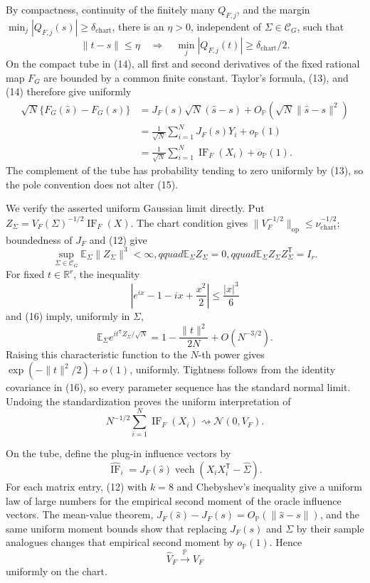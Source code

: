 By compactness, continuity of the finitely many \(Q_{F,j}\), and the margin \(\min_j|Q_{F,j}(s)|\geq\delta_{\mathrm{chart}}\), there is an \(\eta>0\), independent of \(\Sigma\in\mathcal C_G\), such that
\[
 \|t-s\|\leq\eta\quad\Longrightarrow\quad
 \min_j|Q_{F,j}(t)|\geq\delta_{\mathrm{chart}}/2. \tag{14}
\]
On the compact tube in (14), all first and second derivatives of the fixed rational map \(F_G\) are bounded by a common finite constant.  Taylor's formula, (13), and (14) therefore give uniformly
\[
 \begin{aligned}
 \sqrt N\{F_G(\widehat s)-F_G(s)\}
 &=J_F(s)\sqrt N(\widehat s-s)+O_{\mathbb P}\!\left(\sqrt N\|\widehat s-s\|^2\right)\\
 &=\frac1{\sqrt N}\sum_{i=1}^N J_F(s)Y_i+o_{\mathbb P}(1)\\
 &=\frac1{\sqrt N}\sum_{i=1}^N\operatorname{IF}_F(X_i)+o_{\mathbb P}(1). \tag{15}
 \end{aligned}
\]
The complement of the tube has probability tending to zero uniformly by (13), so the pole convention does not alter (15).

We verify the asserted uniform Gaussian limit directly.  Put \(Z_{\Sigma}=V_F(\Sigma)^{-1/2}\operatorname{IF}_F(X)\).  The chart condition gives \(\|V_F^{-1/2}\|_{\mathrm{op}}\leq\nu_{\mathrm{chart}}^{-1/2}\); boundedness of \(J_F\) and (12) give
\[
 \sup_{\Sigma\in\mathcal C_G}\mathbb E_\Sigma\|Z_\Sigma\|^3<\infty,qquad
 \mathbb E_\Sigma Z_\Sigma=0,qquad
 \mathbb E_\Sigma Z_\Sigma Z_\Sigma^{\mathsf T}=I_r. \tag{16}
\]
For fixed \(t\in\mathbb R^r\), the inequality
\[
 \left|e^{ix}-1-ix+\frac{x^2}{2}\right|\leq\frac{|x|^3}{6}
\]
and (16) imply, uniformly in \(\Sigma\),
\[
 \mathbb E_\Sigma e^{it^{\mathsf T}Z_\Sigma/\sqrt N}
 =1-\frac{\|t\|^2}{2N}+O(N^{-3/2}).
\]
Raising this characteristic function to the \(N\)-th power gives \(\exp(-\|t\|^2/2)+o(1)\), uniformly.  Tightness follows from the identity covariance in (16), so every parameter sequence has the standard normal limit.  Undoing the standardization proves the uniform interpretation of
\[
 N^{-1/2}\sum_{i=1}^N\operatorname{IF}_F(X_i)\rightsquigarrow\mathcal N(0,V_F). \tag{17}
\]

On the tube, define the plug-in influence vectors by
\[
 \widehat{\operatorname{IF}}_{i}
 =J_F(\widehat s)\operatorname{vech}(X_iX_i^{\mathsf T}-\widehat\Sigma).
\]
For each matrix entry, (12) with \(k=8\) and Chebyshev's inequality give a uniform law of large numbers for the empirical second moment of the oracle influence vectors.  The mean-value theorem, \(J_F(\widehat s)-J_F(s)=O_{\mathbb P}(\|\widehat s-s\|)\), and the same uniform moment bounds show that replacing \(J_F(s)\) and \(\Sigma\) by their sample analogues changes that empirical second moment by \(o_{\mathbb P}(1)\).  Hence
\[
 \widehat V_F\xrightarrow{\mathbb P}V_F \tag{18}
\]
uniformly on the chart.

